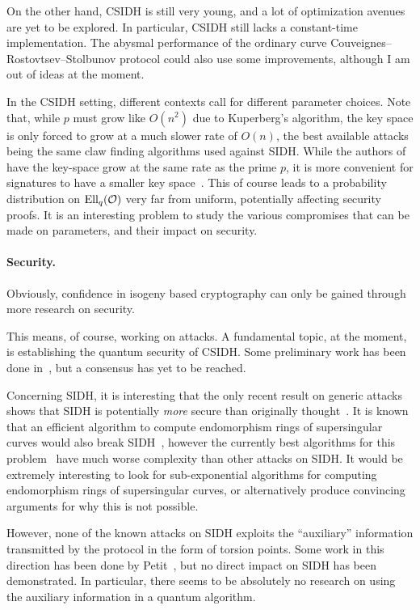 \documentclass{report}
\theoremstyle{plain}
\theoremstyle{definition}
\begin{document}
On the other hand, CSIDH is still very young, and a lot of
optimization avenues are yet to be explored. %
In particular, CSIDH still lacks a constant-time implementation. %
The abysmal performance of the ordinary curve
Couveignes--Rostovtsev--Stolbunov protocol could also use some
improvements, although I am out of ideas at the moment.

In the CSIDH setting, different contexts call for different parameter
choices. %
Note that, while $p$ must grow like $O(n^2)$ due to Kuperberg's
algorithm, the key space is only forced to grow at a much slower rate
of $O(n)$, the best available attacks being the same claw finding
algorithms used against SIDH. %
While the authors of~\cite{cryptoeprint:2018:383} have the key-space
grow at the same rate as the prime $p$, it is more convenient for
signatures to have a smaller key space~\cite{cryptoeprint:2018:824}. %
This of course leads to a probability distribution on $\operatorname{Ell}_q(\mathcal{O})$
very far from uniform, potentially affecting security proofs. %
It is an interesting problem to study the various compromises that can
be made on parameters, and their impact on security.

\paragraph{Security.}
Obviously, confidence in isogeny based cryptography can only be gained
through more research on security. %

This means, of course, working on attacks. %
A fundamental topic, at the moment, is establishing the quantum
security of CSIDH. %
Some preliminary work has been done
in~\cite{BS18,BIJ18,Jao-etal-kuperberg-2018}, but a consensus has yet
to be reached. %

Concerning SIDH, it is interesting that the only recent result on
generic attacks shows that SIDH is potentially \emph{more} secure than
originally thought~\cite{cryptoeprint:2018:313}. %
It is known that an efficient algorithm to compute endomorphism rings
of supersingular curves would also break
SIDH~\cite{galbraithsecurity}, however the currently best algorithms
for this problem~\cite{citeulike:10772345,kohel} have much worse
complexity than other attacks on SIDH. %
It would be extremely interesting to look for sub-exponential
algorithms for computing endomorphism rings of supersingular curves,
or alternatively produce convincing arguments for why this is not
possible.

However, none of the known attacks on SIDH exploits the ``auxiliary''
information transmitted by the protocol in the form of torsion
points. %
Some work in this direction has been done by
Petit~\cite{10.1007/978-3-319-70697-9_12}, but no direct impact on
SIDH has been demonstrated. %
In particular, there seems to be absolutely no research on using the
auxiliary information in a quantum algorithm. %
\end{document}
